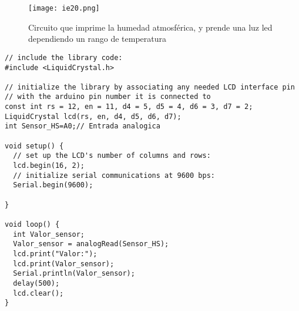 \begin{figure}[h!]
    \centering
      \texttt{[image: ie20.png]}
      \caption{Circuito que imprime la humedad atmosférica, y prende una luz led dependiendo un rango de temperatura}
      \label{ie20}
\end{figure}
\begin{lstlisting}[style=cFrameTB, gobble=4]
// include the library code:
#include <LiquidCrystal.h>

// initialize the library by associating any needed LCD interface pin
// with the arduino pin number it is connected to
const int rs = 12, en = 11, d4 = 5, d5 = 4, d6 = 3, d7 = 2;
LiquidCrystal lcd(rs, en, d4, d5, d6, d7);
int Sensor_HS=A0;// Entrada analogica
  
void setup() {
  // set up the LCD's number of columns and rows:
  lcd.begin(16, 2);
  // initialize serial communications at 9600 bps:
  Serial.begin(9600);
  
}

void loop() {
  int Valor_sensor;
  Valor_sensor = analogRead(Sensor_HS);
  lcd.print("Valor:");
  lcd.print(Valor_sensor);
  Serial.println(Valor_sensor);
  delay(500);
  lcd.clear();
}
\end{lstlisting}









































